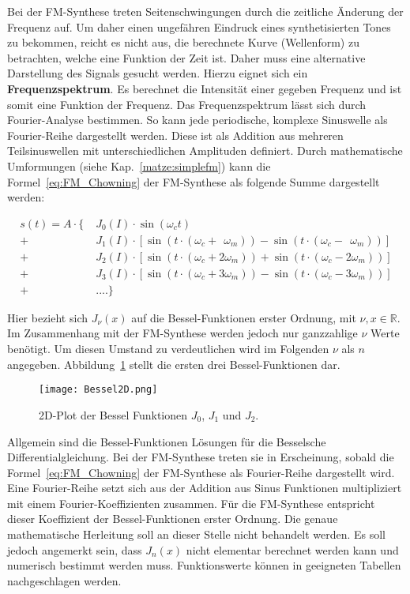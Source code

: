 Bei der FM-Synthese treten Seitenschwingungen durch die zeitliche Änderung der Frequenz auf. Um daher einen ungefähren Eindruck eines synthetisierten Tones zu bekommen, reicht es nicht aus, die berechnete Kurve (Wellenform) zu betrachten, welche eine Funktion der Zeit ist. Daher muss eine alternative Darstellung des Signals gesucht werden. 
Hierzu eignet sich ein \textbf{Frequenzspektrum}. Es berechnet die Intensität einer gegeben Frequenz und ist somit eine Funktion der Frequenz. Das Frequenzspektrum lässt sich durch Fourier-Analyse bestimmen. So kann jede periodische, komplexe Sinuswelle als Fourier-Reihe dargestellt werden. Diese ist als Addition aus mehreren Teilsinuswellen mit unterschiedlichen Amplituden definiert. \cite[S. 33]{raichel} Durch mathematische Umformungen (siehe Kap.~\ref{matze:simplefm}) kann die Formel~\ref{eq:FM_Chowning} der FM-Synthese als folgende Summe dargestellt werden: \cite{chowningPaper}

\begin{equation}
\begin{split}
s(t)=A\cdot \{\; & J_0(I)\cdot\sin(\omega_c t)  \\
         +&J_1(I)\cdot [\sin(t\cdot (\omega_c + \;\,\omega_m))-\sin(t\cdot (\omega_c-\;\,\omega_m))] \\
         +&J_2(I)\cdot [\sin(t\cdot (\omega_c + 2\omega_m))+\sin(t\cdot (\omega_c-2\omega_m))] \\
         +&J_3(I)\cdot [\sin(t\cdot (\omega_c + 3\omega_m))-\sin(t\cdot (\omega_c-3\omega_m))] \\
         +&....\}
\end{split}
\label{eq:chowningAddition}
\end{equation}

Hier bezieht sich $J_\nu(x)$ auf die Bessel-Funktionen erster Ordnung, mit $\nu,x \in \mathbb{R}$. \cite[S. 223]{temme} Im Zusammenhang mit der FM-Synthese werden jedoch nur ganzzahlige $\nu$ Werte benötigt. Um diesen Umstand zu verdeutlichen wird im Folgenden $\nu$ als $n$ angegeben. Abbildung~\ref{fig:bessel2D} stellt die ersten drei Bessel-Funktionen dar.

\begin{figure} [ht]
\centering
  \texttt{[image: Bessel2D.png]}
\caption{2D-Plot der Bessel Funktionen $J_0$, $J_1$ und $J_2$.}
\label{fig:bessel2D}
\end{figure}

\FloatBarrier


Allgemein sind die Bessel-Funktionen Lösungen für die Besselsche Differentialgleichung. \cite[S. 220]{temme} Bei der FM-Synthese treten sie in Erscheinung, sobald die Formel~\ref{eq:FM_Chowning} der FM-Synthese als Fourier-Reihe dargestellt wird. Eine Fourier-Reihe setzt sich aus der Addition aus Sinus Funktionen multipliziert mit einem Fourier-Koeffizienten zusammen. Für die FM-Synthese entspricht dieser Koeffizient der Bessel-Funktionen erster Ordnung. \cite[S. 221]{lathi} Die genaue mathematische Herleitung soll an dieser Stelle nicht behandelt werden. Es soll jedoch angemerkt sein, dass $J_n(x)$ nicht elementar berechnet werden kann und numerisch bestimmt werden muss. \cite[S. 385]{abramowitz} Funktionswerte können in geeigneten Tabellen nachgeschlagen werden. \cite{davis}

